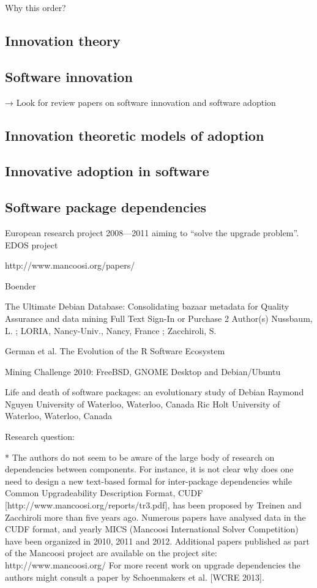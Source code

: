 \documentclass[smallextended,final]{svjour3}
\begin{document}
Why this order?

\subsection{Innovation theory}


\subsection{Software innovation}

→ Look for review papers on software innovation and software adoption


\subsection{Innovation theoretic models of adoption}


\subsection{Innovative adoption in software}


\subsection{Software package dependencies}

European research project 2008—2011 aiming to ``solve the upgrade problem''.
EDOS project

http://www.mancoosi.org/papers/

Boender 

The Ultimate Debian Database: Consolidating bazaar metadata for Quality Assurance and data mining
Full Text Sign-In or Purchase
2 Author(s)
Nussbaum, L. ; LORIA, Nancy-Univ., Nancy, France ; Zacchiroli, S.

German et al. The Evolution of the R Software Ecosystem

Mining Challenge 2010: FreeBSD, GNOME Desktop and Debian/Ubuntu


Life and death of software packages: an evolutionary study of Debian
Raymond Nguyen  University of Waterloo, Waterloo, Canada
Ric Holt        University of Waterloo, Waterloo, Canada


Research question:

* The authors do not seem to be aware of the large body of research on dependencies between components. For instance, it is not clear why does one need to design a new text-based formal for inter-package dependencies while Common Upgradeability Description Format, CUDF [http://www.mancoosi.org/reports/tr3.pdf], has been proposed by Treinen and Zacchiroli more than five years ago. Numerous papers have analysed data in the CUDF format, and yearly MICS (Mancoosi International Solver Competition) have been organized in 2010, 2011 and 2012. Additional papers published as part of the Mancoosi project are available on the project site: http://www.mancoosi.org/ For more recent work on upgrade dependencies the authors might consult a paper by Schoenmakers et al. [WCRE 2013].
\end{document}

